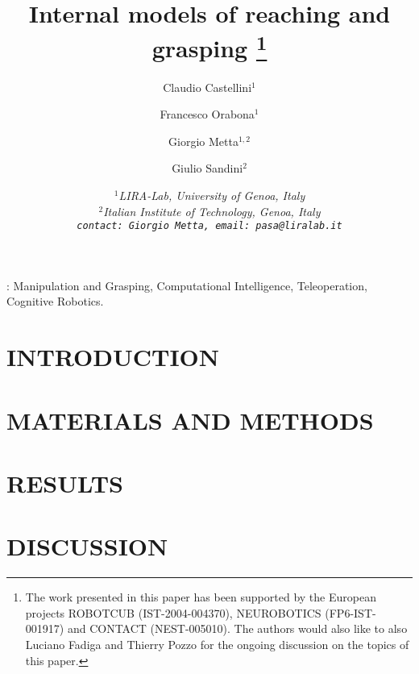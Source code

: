 \documentclass[a4paper]{arsubmit}
\title{Internal models of reaching and grasping
\footnote{The work presented in this paper has been supported by the
European projects ROBOTCUB (IST-2004-004370), NEUROBOTICS
(FP6-IST-001917) and CONTACT (NEST-005010). The authors would also
like to also Luciano Fadiga and Thierry Pozzo for the ongoing
discussion on the topics of this paper.}
}
\author{Claudio Castellini$^1$ \and Francesco Orabona$^1$ \and Giorgio
Metta$^{1,2}$ \and Giulio Sandini$^2$}
\date{\small \it{
$^1$LIRA-Lab, University of Genoa, Italy\\
$^2$Italian Institute of Technology, Genoa, Italy\\
{\tt contact: Giorgio Metta, email: pasa@liralab.it}
}}
\begin{document}
\maketitle

\begin{abstract}

\end{abstract}

\vspace{1cm}
:
Manipulation and Grasping,
Computational Intelligence,
Teleoperation,
Cognitive Robotics.

\section{INTRODUCTION}
\label{sec:introduction}


\section{MATERIALS AND METHODS}
\label{sec:exp_desc}


\section{RESULTS}
\label{sec:exp_res}


\section{DISCUSSION}
\label{sec:Conclusions}


{\small


}
\end{document}
